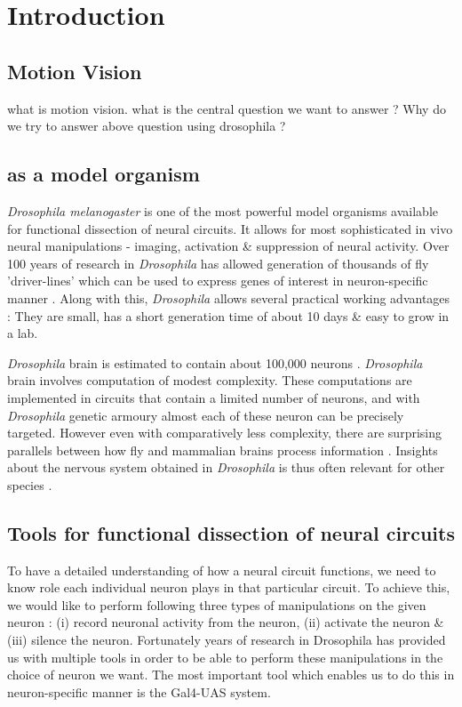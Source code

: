 \chapter{Introduction}
\label{chp:Introduction}

\section{Motion Vision}
what is motion vision. what is the central question we want to answer ? Why do we try to answer above question using drosophila ?

\section{\protect{} as a model organism}
\textit{Drosophila melanogaster} is one of the most powerful model organisms available for functional dissection of neural circuits. It allows for most sophisticated in vivo neural manipulations - imaging, activation \& suppression of neural activity. Over 100 years of research in \textit{Drosophila} has allowed generation of thousands of fly 'driver-lines' which can be used to express genes of interest in neuron-specific manner \parencite{Pfeiffer2008}. Along with this, \textit{Drosophila} allows several practical working advantages : They are small, has a short generation time of about 10 days \& easy to grow in a lab. 

\textit{Drosophila} brain is estimated to contain about 100,000 neurons \parencite{Zheng2018}. \textit{Drosophila} brain involves computation of modest complexity. These computations are implemented in circuits that contain a limited number of neurons, and with \textit{Drosophila} genetic armoury almost each of these neuron can be precisely targeted. However even with comparatively less complexity, there are surprising parallels between how fly and mammalian brains process information \parencite{Borst2015}. Insights about the nervous system obtained in \textit{Drosophila} is thus often relevant for other species \parencite{Bellen2010, Venken2011}.

\section{Tools for functional dissection of \protect{} neural circuits}
To have a detailed understanding of how a neural circuit functions, we need to know role each individual neuron plays in that particular circuit. To achieve this, we would like to perform following three types of manipulations on the given neuron : (i) record neuronal activity from the neuron, (ii) activate the neuron \& (iii) silence the neuron. Fortunately years of research in Drosophila has provided us with multiple tools in order to be able to perform these manipulations in the choice of neuron we want. The most important tool which enables us to do this in neuron-specific manner is the Gal4-UAS system. 

